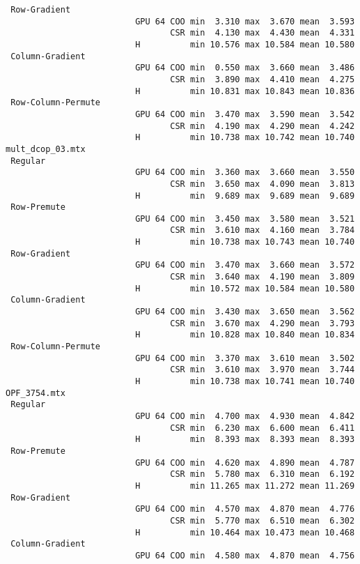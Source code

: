 {\begin{verbatim}
 Row-Gradient
                          GPU 64 COO min  3.310 max  3.670 mean  3.593
                                 CSR min  4.130 max  4.430 mean  4.331
                          H          min 10.576 max 10.584 mean 10.580
 Column-Gradient
                          GPU 64 COO min  0.550 max  3.660 mean  3.486
                                 CSR min  3.890 max  4.410 mean  4.275
                          H          min 10.831 max 10.843 mean 10.836
 Row-Column-Permute
                          GPU 64 COO min  3.470 max  3.590 mean  3.542
                                 CSR min  4.190 max  4.290 mean  4.242
                          H          min 10.738 max 10.742 mean 10.740
mult_dcop_03.mtx
 Regular
                          GPU 64 COO min  3.360 max  3.660 mean  3.550
                                 CSR min  3.650 max  4.090 mean  3.813
                          H          min  9.689 max  9.689 mean  9.689
 Row-Premute
                          GPU 64 COO min  3.450 max  3.580 mean  3.521
                                 CSR min  3.610 max  4.160 mean  3.784
                          H          min 10.738 max 10.743 mean 10.740
 Row-Gradient
                          GPU 64 COO min  3.470 max  3.660 mean  3.572
                                 CSR min  3.640 max  4.190 mean  3.809
                          H          min 10.572 max 10.584 mean 10.580
 Column-Gradient
                          GPU 64 COO min  3.430 max  3.650 mean  3.562
                                 CSR min  3.670 max  4.290 mean  3.793
                          H          min 10.828 max 10.840 mean 10.834
 Row-Column-Permute
                          GPU 64 COO min  3.370 max  3.610 mean  3.502
                                 CSR min  3.610 max  3.970 mean  3.744
                          H          min 10.738 max 10.741 mean 10.740
OPF_3754.mtx
 Regular
                          GPU 64 COO min  4.700 max  4.930 mean  4.842
                                 CSR min  6.230 max  6.600 mean  6.411
                          H          min  8.393 max  8.393 mean  8.393
 Row-Premute
                          GPU 64 COO min  4.620 max  4.890 mean  4.787
                                 CSR min  5.780 max  6.310 mean  6.192
                          H          min 11.265 max 11.272 mean 11.269
 Row-Gradient
                          GPU 64 COO min  4.570 max  4.870 mean  4.776
                                 CSR min  5.770 max  6.510 mean  6.302
                          H          min 10.464 max 10.473 mean 10.468
 Column-Gradient
                          GPU 64 COO min  4.580 max  4.870 mean  4.756

\end{verbatim}}
